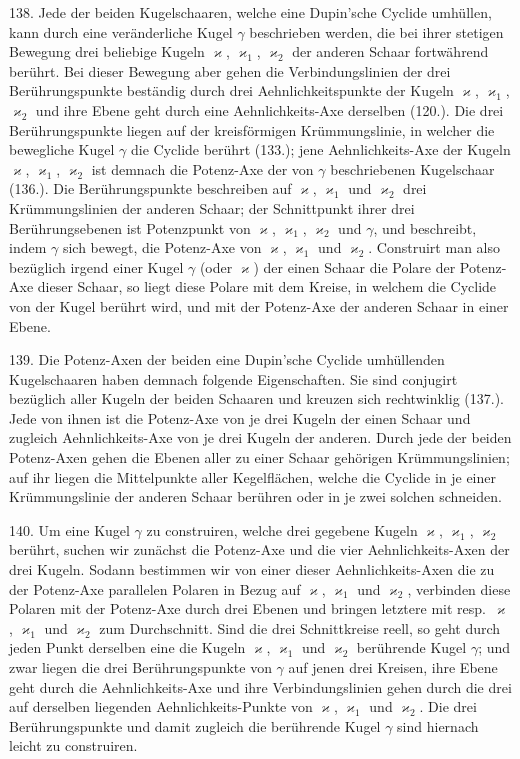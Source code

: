 138. Jede der beiden Kugelschaaren, welche eine Dupin'sche
Cyclide umh\"ullen, kann durch eine ver\"anderliche Kugel $\gamma$
beschrieben werden, die bei ihrer stetigen Bewegung drei
beliebige Kugeln $\varkappa$, $\varkappa_1$, $\varkappa_2$ der anderen Schaar fortw\"ahrend
ber\"uhrt. Bei dieser Bewegung aber gehen die Verbindungslinien
der drei Ber\"uhrungspunkte best\"andig durch drei Aehnlichkeitspunkte
der Kugeln $\varkappa$, $\varkappa_1$, $\varkappa_2$ und ihre Ebene geht
durch eine Aehnlichkeits-Axe derselben (120.). Die drei Ber\"uhrungspunkte
liegen auf der kreisf\"ormigen Kr\"ummungslinie,
in welcher die bewegliche Kugel $\gamma$ die Cyclide ber\"uhrt (133.);
jene Aehnlichkeits-Axe der Kugeln $\varkappa$, $\varkappa_1$, $\varkappa_2$ ist demnach die
Potenz-Axe der von $\gamma$ beschriebenen Kugelschaar (136.). Die
Ber\"uhrungspunkte beschreiben auf $\varkappa$, $\varkappa_1$ und $\varkappa_2$ drei Kr\"ummungslinien
der anderen Schaar; der Schnittpunkt ihrer drei
Ber\"uhrungsebenen ist Potenzpunkt von $\varkappa$, $\varkappa_1$, $\varkappa_2$ und $\gamma$, und
beschreibt, indem $\gamma$ sich bewegt, die Potenz-Axe von $\varkappa$, $\varkappa_1$
und $\varkappa_2$. Construirt man also bez\"uglich irgend einer Kugel $\gamma$
(oder $\varkappa$) der einen Schaar die Polare der Potenz-Axe dieser
Schaar, so liegt diese Polare mit dem Kreise, in welchem
die Cyclide von der Kugel ber\"uhrt wird, und mit der Potenz-Axe
der anderen Schaar in einer Ebene.

139. Die Potenz-Axen der beiden eine Dupin'sche Cyclide
umh\"ullenden Kugelschaaren haben demnach folgende Eigenschaften.
Sie sind conjugirt bez\"uglich aller Kugeln der beiden
Schaaren und kreuzen sich rechtwinklig (137.). Jede von
ihnen ist die Potenz-Axe von je drei Kugeln der einen Schaar
und zugleich Aehnlichkeits-Axe von je drei Kugeln der anderen.
Durch jede der beiden Potenz-Axen gehen die Ebenen aller
zu einer Schaar geh\"origen Kr\"ummungslinien; auf ihr liegen
die Mittelpunkte aller Kegelfl\"achen, welche die Cyclide
in je einer Kr\"ummungslinie der anderen Schaar ber\"uhren
oder in je zwei solchen schneiden.

140. Um eine Kugel $\gamma$ zu construiren, welche drei gegebene
Kugeln $\varkappa$, $\varkappa_1$, $\varkappa_2$ ber\"uhrt, suchen wir zun\"achst die
Potenz-Axe und die vier Aehnlichkeits-Axen der drei Kugeln.
Sodann bestimmen wir von einer dieser Aehnlichkeits-Axen
die zu der Potenz-Axe parallelen Polaren in Bezug auf $\varkappa$, $\varkappa_1$
und $\varkappa_2$, verbinden diese Polaren mit der Potenz-Axe durch
drei Ebenen und bringen letztere mit resp.\ $\varkappa$, $\varkappa_1$ und $\varkappa_2$ zum
Durchschnitt. Sind die drei Schnittkreise reell, so geht durch
jeden Punkt derselben eine die Kugeln $\varkappa$, $\varkappa_1$ und $\varkappa_2$ ber\"uhrende
Kugel $\gamma$; und zwar liegen die drei Ber\"uhrungspunkte von $\gamma$
auf jenen drei Kreisen, ihre Ebene geht durch die Aehnlichkeits-Axe
und ihre Verbindungslinien gehen durch die drei
auf derselben liegenden Aehnlichkeits-Punkte von $\varkappa$, $\varkappa_1$ und $\varkappa_2$.
Die drei Ber\"uhrungspunkte und damit zugleich die ber\"uhrende
Kugel $\gamma$ sind hiernach leicht zu construiren.

